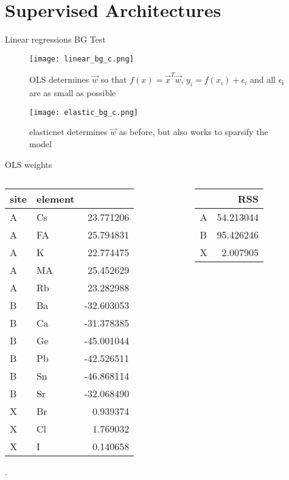 \documentclass[10pt, compress]{beamer}
\begin{document}
\section{Supervised Architectures}
\label{sec:orgbcf7b38}
\begin{frame}[allowframebreaks]{Linear regressions BG Test}
\begin{figure}[htbp]
\centering
\texttt{[image: linear\_bg\_c.png]}
\caption{OLS determines \(\vec{w}\) so that \(f(x) = \vec{x}^T\vec{w}\), \(y_i = f(x_i) + \epsilon_i\) and all \(\epsilon\)\textsubscript{i} are as small as possible}
\end{figure}

\begin{figure}[htbp]
\centering
\texttt{[image: elastic\_bg\_c.png]}
\caption{elasticnet determines \(\vec{w}\) as before, but also works to sparsify the model}
\end{figure}
\end{frame}
\begin{frame}[label={sec:org229b90c}]{OLS weights}
\begin{columns}
\begin{column}{0.7\columnwidth}
\begin{center}
\begin{tabular}{llr}
site & element & \\
\hline
A & Cs & 23.771206\\
A & FA & 25.794831\\
A & K & 22.774475\\
A & MA & 25.452629\\
A & Rb & 23.282988\\
B & Ba & -32.603053\\
B & Ca & -31.378385\\
B & Ge & -45.001044\\
B & Pb & -42.526511\\
B & Sn & -46.868114\\
B & Sr & -32.068490\\
X & Br & 0.939374\\
X & Cl & 1.769032\\
X & I & 0.140658\\
\end{tabular}
\end{center}
.
\end{column}
\begin{column}{0.3\columnwidth}
\begin{center}
\begin{tabular}{lr}
 & RSS\\
\hline
A & 54.213044\\
B & 95.426246\\
X & 2.007905\\
\end{tabular}
\end{center}
\end{column}
\end{columns}
\end{frame}
\end{document}
